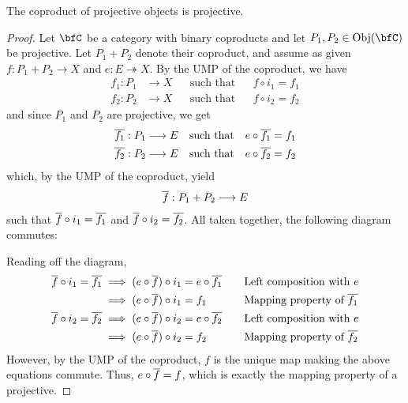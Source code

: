 \documentclass[a5paper]{article}
\begin{document}
\begin{theorem*}
	The coproduct of projective objects is projective. 
\end{theorem*}
\begin{proof}
  Let $\bfC$ be a category with binary coproducts and let $P_1,P_2\in\Obj(\bfC)$
  be projective. Let $P_1+P_2$ denote their coproduct, and assume as given
  $f:P_1+P_2\to X$ and $e:E\twoheadrightarrow X$. By the UMP of the coproduct,
  we have
  \begin{align*}
    f_1:P_1&\longrightarrow X  &&\text{such that}&& f\circ i_1 = f_1 \\
    f_2:P_2&\longrightarrow X  &&\text{such that}&& f\circ i_2 = f_2 
  \end{align*}
  and since $P_1$ and $P_2$ are projective, we get
  \begin{align*}
    \overline{f_1}:P_1\longrightarrow E &&\text{such that}&& e\circ \overline{f_1} = f_1 \\
    \overline{f_2}:P_2\longrightarrow E &&\text{such that}&& e\circ \overline{f_2} = f_2
  \end{align*}
  which, by the UMP of the coproduct, yield
  \begin{align*}
    \overline{f}:P_1+P_2\longrightarrow E
  \end{align*}
  such that $\overline{f}\circ i_1=\overline{f_1}$ and $\overline{f}\circ i_2=\overline{f_2}$. All taken
  together, the following diagram commutes:
  \begin{center}
  \end{center}
  Reading off the diagram,
  \begin{align*}
    \overline{f} \circ i_1 = \overline{f_1}
    &\implies (e\circ\overline{f})\circ i_1 = e\circ\overline{f_1}
    &&\quad\text{Left composition with }e \\
    &\implies (e\circ\overline{f})\circ i_1 = f_1
    &&\quad\text{Mapping property of }\overline{f_1} \\
    \overline{f} \circ i_2 = \overline{f_2}
    &\implies (e\circ\overline{f})\circ i_2 = e\circ\overline{f_2}
    &&\quad\text{Left composition with }e \\
    &\implies (e\circ\overline{f})\circ i_2 = f_2
    &&\quad\text{Mapping property of }\overline{f_2}
  \end{align*}
  However, by the UMP of the coproduct, $f$ is the unique map making the above
  equations commute.
  Thus, $e\circ\overline{f}=f$, which is exactly the mapping property of a
  projective.
\end{proof}
\end{document}
